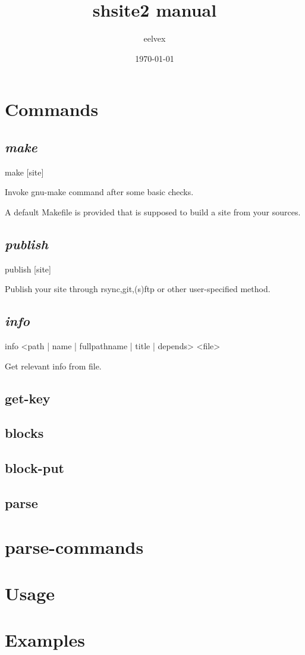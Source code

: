 \documentclass{memoir}
\title{shsite2 manual}
\author{eelvex}
\date{\today}
\begin{document}
\begin{titlingpage}
\maketitle
\end{titlingpage}
\tableofcontents

\chapter{Commands} %

\section{\emph{make}}
make [site]

Invoke gnu-make command after some basic checks.

A default Makefile is provided that is supposed to build a site from your sources.
\section{\emph{publish}}
publish [site]

Publish your site through rsync,git,(s)ftp or other user-specified method.
\section{\emph{info}}
info <path | name | fullpathname | title | depends> <file>

Get relevant info from file.
\section{get-key}
\section{blocks}
\section{block-put}
\section{parse}

\chapter{parse-commands}
\chapter{Usage}
\chapter{Examples}
\end{document}
